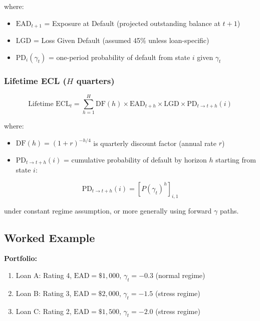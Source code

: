 \documentclass[12pt,a4paper]{article}
\newcommand{\ECL}{\text{ECL}}
\newcommand{\EAD}{\text{EAD}}
\newcommand{\LGD}{\text{LGD}}
\newcommand{\PD}{\text{PD}}
\begin{document}
where:
\begin{itemize}[noitemsep]
    \item $\EAD_{t+1}$ = Exposure at Default (projected outstanding balance at $t+1$)
    \item $\LGD$ = Loss Given Default (assumed 45\% unless loan-specific)
    \item $\PD_i(\gamma_t)$ = one-period probability of default from state $i$ given $\gamma_t$
\end{itemize}

\subsubsection*{Lifetime ECL ($H$ quarters)}

\begin{equation}
\label{eq:lifetime_ecl}
\text{Lifetime } \ECL_t = \sum_{h=1}^H \text{DF}(h) \times \EAD_{t+h} \times \LGD \times \PD_{t \to t+h}(i)
\end{equation}

where:
\begin{itemize}[noitemsep]
    \item $\text{DF}(h) = (1 + r)^{-h/4}$ is quarterly discount factor (annual rate $r$)
    \item $\PD_{t \to t+h}(i)$ = cumulative probability of default by horizon $h$ starting from state $i$:
\end{itemize}

\begin{equation}
\PD_{t \to t+h}(i) = [P(\gamma_t)^h]_{i,1}
\end{equation}

under constant regime assumption, or more generally using forward $\gamma$ paths.

\subsection{Worked Example}

\textbf{Portfolio:}
\begin{enumerate}[noitemsep]
    \item Loan A: Rating 4, $\EAD = \$1{,}000$, $\gamma_t = -0.3$ (normal regime)
    \item Loan B: Rating 3, $\EAD = \$2{,}000$, $\gamma_t = -1.5$ (stress regime)
    \item Loan C: Rating 2, $\EAD = \$1{,}500$, $\gamma_t = -2.0$ (stress regime)
\end{enumerate}
\end{document}
